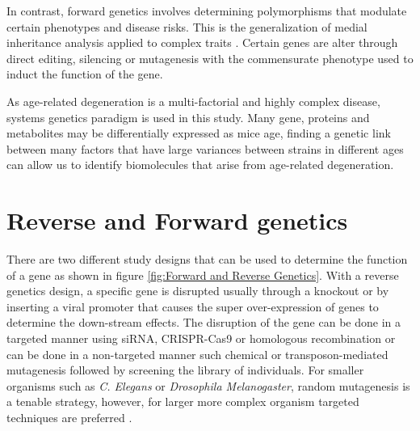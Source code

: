 \documentclass[a4paper,11pt,twoside]{book}
\begin{document}
	In contrast, forward genetics involves determining polymorphisms that modulate certain phenotypes and disease risks. This is the generalization of medial inheritance analysis applied to complex traits \citep{Williams2015TheAnalysis}. Certain genes are alter through direct editing, silencing or mutagenesis with the commensurate phenotype used to induct the function of the gene. 
	
	As age-related degeneration is a multi-factorial and highly complex disease, systems genetics paradigm is used in this study. Many gene, proteins and metabolites may be differentially expressed as mice age, finding a genetic link between many factors that have large variances between strains in different ages can allow us to identify biomolecules that arise from age-related degeneration.
		
	\section{Reverse and Forward genetics}
	
		There are two different study designs that can be used to determine the function of a gene as shown in figure \ref{fig:Forward and Reverse Genetics}. With a reverse genetics design, a specific gene is disrupted usually through a knockout or by inserting a viral promoter that causes the super over-expression of genes to determine the down-stream effects. The disruption of the gene can be done in a targeted manner using siRNA, CRISPR-Cas9 or homologous recombination or can be done in a non-targeted manner such chemical or transposon-mediated mutagenesis followed by screening the library of individuals\citep{MelindaB.TierneyandKurtH.Lamour2005}. For smaller organisms such as  \textit{C. Elegans} or \textit{Drosophila Melanogaster}, random mutagenesis is a tenable strategy, however, for larger more complex organism targeted techniques are preferred \citep{MelindaB.TierneyandKurtH.Lamour2005}.
		
\end{document}
